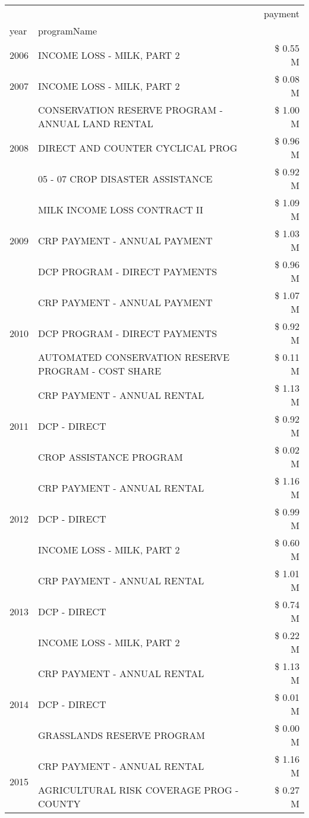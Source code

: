 \begin{tabular}{llr}
\toprule
 &  & payment \\
year & programName &  \\
\midrule
2006 & INCOME LOSS - MILK, PART 2 & \$ 0.55 M \\
\cline{1-3}
2007 & INCOME LOSS - MILK, PART 2 & \$ 0.08 M \\
\cline{1-3}
\multirow[t]{3}{*}{2008} & CONSERVATION RESERVE PROGRAM - ANNUAL LAND RENTAL & \$ 1.00 M \\
 & DIRECT AND COUNTER CYCLICAL PROG & \$ 0.96 M \\
 & 05 - 07 CROP DISASTER ASSISTANCE & \$ 0.92 M \\
\cline{1-3}
\multirow[t]{3}{*}{2009} & MILK INCOME LOSS CONTRACT II & \$ 1.09 M \\
 & CRP PAYMENT - ANNUAL PAYMENT & \$ 1.03 M \\
 & DCP PROGRAM - DIRECT PAYMENTS & \$ 0.96 M \\
\cline{1-3}
\multirow[t]{3}{*}{2010} & CRP PAYMENT - ANNUAL PAYMENT & \$ 1.07 M \\
 & DCP PROGRAM - DIRECT PAYMENTS & \$ 0.92 M \\
 & AUTOMATED CONSERVATION RESERVE PROGRAM - COST SHARE & \$ 0.11 M \\
\cline{1-3}
\multirow[t]{3}{*}{2011} & CRP PAYMENT - ANNUAL RENTAL & \$ 1.13 M \\
 & DCP - DIRECT & \$ 0.92 M \\
 & CROP ASSISTANCE PROGRAM & \$ 0.02 M \\
\cline{1-3}
\multirow[t]{3}{*}{2012} & CRP PAYMENT - ANNUAL RENTAL & \$ 1.16 M \\
 & DCP - DIRECT & \$ 0.99 M \\
 & INCOME LOSS - MILK, PART 2 & \$ 0.60 M \\
\cline{1-3}
\multirow[t]{3}{*}{2013} & CRP PAYMENT - ANNUAL RENTAL & \$ 1.01 M \\
 & DCP - DIRECT & \$ 0.74 M \\
 & INCOME LOSS - MILK, PART 2 & \$ 0.22 M \\
\cline{1-3}
\multirow[t]{3}{*}{2014} & CRP PAYMENT - ANNUAL RENTAL & \$ 1.13 M \\
 & DCP - DIRECT & \$ 0.01 M \\
 & GRASSLANDS RESERVE PROGRAM & \$ 0.00 M \\
\cline{1-3}
\multirow[t]{3}{*}{2015} & CRP PAYMENT - ANNUAL RENTAL & \$ 1.16 M \\
 & AGRICULTURAL RISK COVERAGE PROG - COUNTY & \$ 0.27 M \\

\end{tabular}
